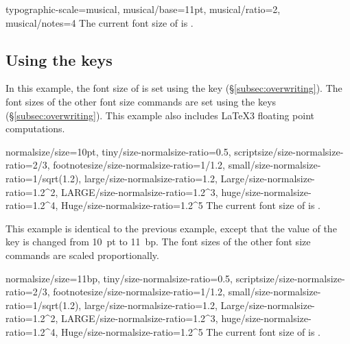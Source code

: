 \documentclass{beerydoc}
\begin{document}
\begin{codedemo}
  \begingroup
    \fontscalesetup
      {
        typographic-scale=musical,
        musical/base=11pt,
        musical/ratio=2,
        musical/notes=4
      }%
    \printsampletext
      {%
        The current font size of \printfontsizecommand{} is
        \the\currentfontsize.
      }
  \endgroup
\end{codedemo}
\clearpage

\subsection
  {%
    Using the keys
    \texorpdfstring
      {}
      {/size-normalsize-ratio}%
  }
\label{subsec:exnameratio}

In this example, the font size of  is set using the key
 (\S\ref{subsec:overwriting}).
The font sizes of the other font size commands are set using the keys
(\S\ref{subsec:overwriting}).
This example also includes \LaTeX3 floating point computations.

\begin{codedemo}
  \begingroup
    \fontscalesetup
      {
        normalsize/size=10pt,
        tiny/size-normalsize-ratio=0.5,
        scriptsize/size-normalsize-ratio=2/3,
        footnotesize/size-normalsize-ratio=1/1.2,
        small/size-normalsize-ratio=1/sqrt(1.2),
        large/size-normalsize-ratio=1.2,
        Large/size-normalsize-ratio=1.2^2,
        LARGE/size-normalsize-ratio=1.2^3,
        huge/size-normalsize-ratio=1.2^4,
        Huge/size-normalsize-ratio=1.2^5
      }%
    \printsampletext
      {%
        The current font size of \printfontsizecommand{} is
        \the\currentfontsize.
      }
  \endgroup
\end{codedemo}
\clearpage

This example is identical to the previous example, except that the value of the
key  is changed from \qty{10}{pt} to \qty{11}{bp}.
The font sizes of the other font size commands are scaled proportionally.

\begin{codedemo}
  \begingroup
    \fontscalesetup
      {
        normalsize/size=11bp,
        tiny/size-normalsize-ratio=0.5,
        scriptsize/size-normalsize-ratio=2/3,
        footnotesize/size-normalsize-ratio=1/1.2,
        small/size-normalsize-ratio=1/sqrt(1.2),
        large/size-normalsize-ratio=1.2,
        Large/size-normalsize-ratio=1.2^2,
        LARGE/size-normalsize-ratio=1.2^3,
        huge/size-normalsize-ratio=1.2^4,
        Huge/size-normalsize-ratio=1.2^5
      }%
    \printsampletext
      {%
        The current font size of \printfontsizecommand{} is
        \the\currentfontsize.
      }
  \endgroup
\end{codedemo}
\end{document}
